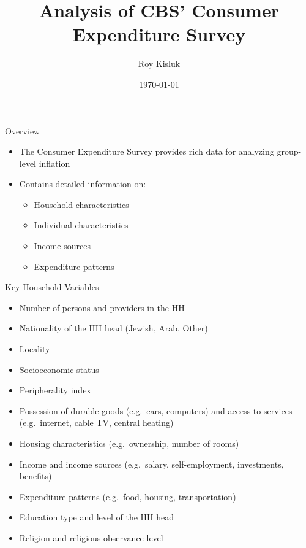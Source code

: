 \documentclass{beamer}
\title{Analysis of CBS' Consumer Expenditure Survey}
\author{Roy Kisluk}
\date{\today}
\begin{document}
\begin{frame}
    \titlepage
\end{frame}

\begin{frame}{Overview}
    \begin{itemize}
        \item The Consumer Expenditure Survey provides rich data for analyzing group-level inflation
        \item Contains detailed information on:
              \begin{itemize}
                  \item Household characteristics
                  \item Individual characteristics
                  \item Income sources
                  \item Expenditure patterns
              \end{itemize}
    \end{itemize}
\end{frame}

\begin{frame}{Key Household Variables}
    \begin{itemize}
        \item Number of persons and providers in the HH
        \item Nationality of the HH head (Jewish, Arab, Other)
        \item Locality
        \item Socioeconomic status
        \item Peripherality index
        \item Possession of durable goods (e.g.\ cars, computers) and access to services (e.g.\ internet, cable TV, central heating)
        \item Housing characteristics (e.g.\ ownership, number of rooms)
        \item Income and income sources (e.g.\ salary, self-employment, investments, benefits)
        \item Expenditure patterns (e.g.\ food, housing, transportation)
        \item Education type and level of the HH head
        \item Religion and religious observance level
    \end{itemize}
\end{frame}
\end{document}
